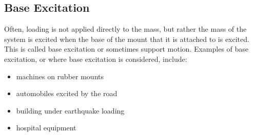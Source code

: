 \documentclass[12pt,letter]{article}
\begin{document}
\subsection{Base Excitation}

	Often, loading is not applied directly to the mass, but rather the mass of the system is excited when the base of the mount that it is attached to is excited. This is called base excitation or sometimes support motion. Examples of base excitation, or where base excitation is considered, include:
	
	\begin{itemize}
	\item machines on rubber mounts
	\item automobiles excited by the road
	\item building under earthquake loading
	\item hospital equipment
	\end{itemize}
	
\end{document}
